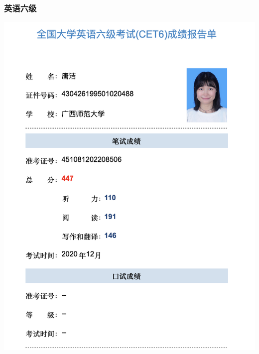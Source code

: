 \documentclass[UFT8]{ctexart}%
\begin{document}

\subsubsection{英语六级}
\includegraphics[scale=0.3]{figs/英语六级.jpg }

%
\end{document}
